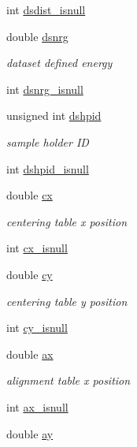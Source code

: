 \begin{DoxyCompactItemize}
int \hyperlink{structlspg__nextshot__struct_ac6f2bdc7b023d933509bf74af7b169f9}{dsdist\-\_\-isnull}
\item 
double \hyperlink{structlspg__nextshot__struct_a371e574055fec7660b8f2e637eaf9f25}{dsnrg}
\begin{DoxyCompactList}\small\item\em dataset defined energy \end{DoxyCompactList}\item 
int \hyperlink{structlspg__nextshot__struct_ad14d8bb50290ec12e58f4aaec5cc5aab}{dsnrg\-\_\-isnull}
\item 
unsigned int \hyperlink{structlspg__nextshot__struct_a5e260a420176f2973cdb100d0a5c4c09}{dshpid}
\begin{DoxyCompactList}\small\item\em sample holder I\-D \end{DoxyCompactList}\item 
int \hyperlink{structlspg__nextshot__struct_afe16be0382423aa3f25cb3d6cf99430b}{dshpid\-\_\-isnull}
\item 
double \hyperlink{structlspg__nextshot__struct_ad9eb2013fa6f295f72f0891fe98c863f}{cx}
\begin{DoxyCompactList}\small\item\em centering table x position \end{DoxyCompactList}\item 
int \hyperlink{structlspg__nextshot__struct_a779b99533f0ed4e659177afb0b791ad2}{cx\-\_\-isnull}
\item 
double \hyperlink{structlspg__nextshot__struct_ab7a7b37a17f06c4e9ebdcdf056946098}{cy}
\begin{DoxyCompactList}\small\item\em centering table y position \end{DoxyCompactList}\item 
int \hyperlink{structlspg__nextshot__struct_a3895d645420848aed05b95694ec8c6c7}{cy\-\_\-isnull}
\item 
double \hyperlink{structlspg__nextshot__struct_a7f57874223897ab7d9c7531a9522904d}{ax}
\begin{DoxyCompactList}\small\item\em alignment table x position \end{DoxyCompactList}\item 
int \hyperlink{structlspg__nextshot__struct_aae46c7911b2b218497ad4a68f3dbb7d9}{ax\-\_\-isnull}
\item 
double \hyperlink{structlspg__nextshot__struct_a9e20b9a0aeb41f7f7d653a1c60335bf1}{ay}

\end{DoxyCompactItemize}
